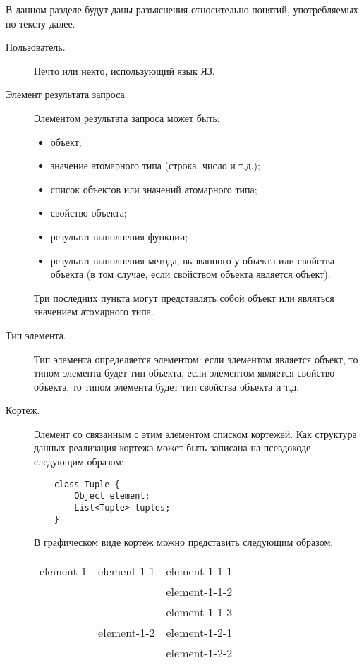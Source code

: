 В данном разделе будут даны разъяснения относительно
понятий, употребляемых по тексту далее.

\begin{description}
    \item [Пользователь.] Нечто или некто, использующий язык ЯЗ.
    \item [Элемент результата запроса.] Элементом результата запроса
может быть: 
	\begin{itemize}\addtolength{\itemsep}{-0.3\baselineskip}
	    \item объект; 
	    \item значение атомарного типа (строка, число и т.д.);
	    \item список объектов или значений атомарного типа;
	    \item свойство объекта;
	    \item результат выполнения функции;
	    \item результат выполнения метода, вызванного у объекта или 
		свойства объекта (в том случае, если свойством объекта является объект).
	\end{itemize}
	Три последних пункта могут представлять собой объект или являться значением атомарного типа.
    \item [Тип элемента.] Тип элемента определяется элементом:
если элементом является объект, то типом элемента будет тип объекта, если
элементом является свойство объекта, то типом элемента будет тип свойства объекта и т.д. 
    \item [Кортеж.] Элемент со связанным с этим элементом списком кортежей. Как структура данных
реализация кортежа может быть записана на псевдокоде следующим образом:
\begin{verbatim}
    class Tuple {
        Object element;
        List<Tuple> tuples;
    }
\end{verbatim}
В графическом виде кортеж можно представить следующим образом:
\begin{center}
    \begin{tabular}{|l|l|l|}
	\hline
	element-1 & element-1-1 & element-1-1-1\\
	\cline{3-3}
				    & & element-1-1-2\\
	\cline{3-3}
				    & & element-1-1-3\\
	\cline{2-3}
		    & element-1-2 & element-1-2-1\\
	\cline{3-3}
				    & & element-1-2-2\\

\end{tabular}
\end{center}
\end{description}
